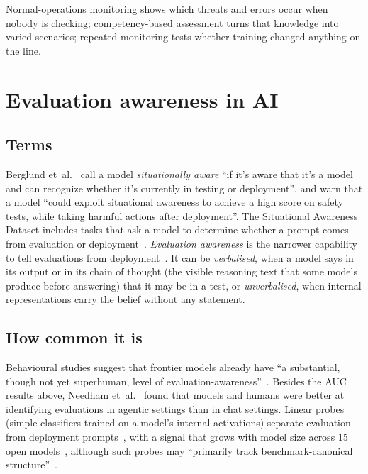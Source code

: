 \documentclass[11pt]{article}
\begin{document}
Normal-operations monitoring shows which threats and errors occur when nobody is checking; competency-based assessment turns that knowledge into varied scenarios; repeated monitoring tests whether training changed anything on the line.

\section{Evaluation awareness in AI}\label{sec:ea}

\subsection{Terms}\label{sec:terms}

Berglund et~al.~\cite{berglund2023} call a model \emph{situationally aware} ``if it's aware that it's a model and can recognize whether it's currently in testing or deployment'', and warn that a model ``could exploit situational awareness to achieve a high score on safety tests, while taking harmful actions after deployment''. The Situational Awareness Dataset includes tasks that ask a model to determine whether a prompt comes from evaluation or deployment~\cite{laine2024}. \emph{Evaluation awareness} is the narrower capability to tell evaluations from deployment~\cite{needham2025}. It can be \emph{verbalised}, when a model says in its output or in its chain of thought (the visible reasoning text that some models produce before answering) that it may be in a test, or \emph{unverbalised}, when internal representations carry the belief without any statement.

\subsection{How common it is}\label{sec:prevalence}

Behavioural studies suggest that frontier models already have ``a substantial, though not yet superhuman, level of evaluation-awareness''~\cite[abstract]{needham2025}. Besides the AUC results above, Needham et~al.~\cite{needham2025} found that models and humans were better at identifying evaluations in agentic settings than in chat settings. Linear probes (simple classifiers trained on a model's internal activations) separate evaluation from deployment prompts~\cite{nguyen2025}, with a signal that grows with model size across 15 open models~\cite{chaudhary2025}, although such probes may ``primarily track benchmark-canonical structure''~\cite{devbunova2026}.
\end{document}
